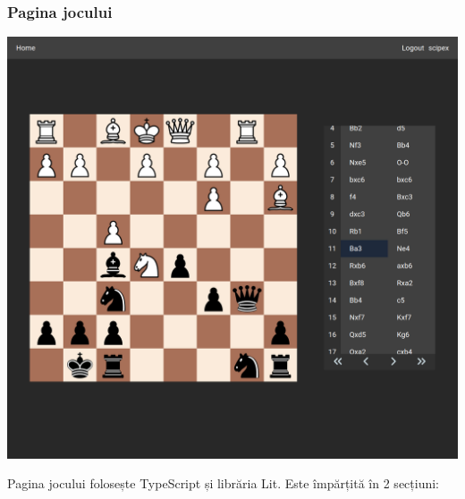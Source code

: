 \vspace{3cm}
\subsubsection{Pagina jocului}

\vspace{1cm}
\begin{center}
	\includegraphics[width=15cm]{3/frontend/game.png}
\end{center}
\vspace{1cm}

Pagina jocului folosește TypeScript și librăria Lit. Este împărțită în 2 secțiuni:

